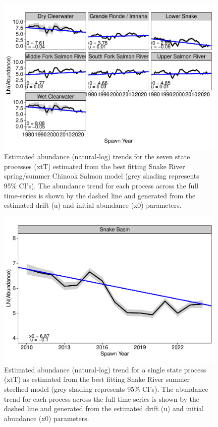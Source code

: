 \documentclass[10pt,a4paper]{article}
\begin{document}
\begin{figure}
\includegraphics[width=1\linewidth]{manuscript_SRAFS_files/figure-latex/chn-state-1} \caption{Estimated abundance (natural-log) trends for the seven state processes (xtT) estimated from the best fitting Snake River spring/summer Chinook Salmon model (grey shading represents 95\% CI's). The abundance trend for each process across the full time-series is shown by the dashed line and generated from the estimated drift (u) and initial abundance (x0) parameters.}\label{fig:chn-state}
\end{figure}

\begin{figure}
\includegraphics[width=1\linewidth]{manuscript_SRAFS_files/figure-latex/sth-state-1} \caption{Estimated abundance (natural-log) trend for a single state process (xtT) as estimated from the best fitting Snake River summer steelhed model (grey shading represents 95\% CI's). The abundance trend for each process across the full time-series is shown by the dashed line and generated from the estimated drift (u) and initial abundance (x0) parameters.}\label{fig:sth-state}
\end{figure}
\end{document}
